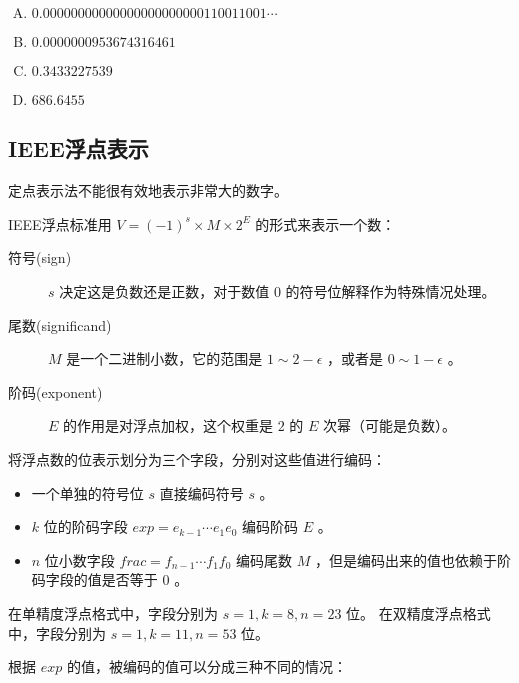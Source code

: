 {{        %
        \begin{practicec}
            \begin{enumerate}[A.]
                \item $0.0000 0000 0000 0000 0000 0001 1001 1001\cdots$
                \item $0.0000000953674316461$
                \item $0.3433227539$
                \item $686.6455$
            \end{enumerate}
        \end{practicec}
    }

    \subsection{IEEE浮点表示}
    {
        定点表示法不能很有效地表示非常大的数字。

        IEEE浮点标准用 $V = (-1)^s \times M \times 2^E$ 的形式来表示一个数：

        \begin{description}
            \item[符号(sign)] $s$ 决定这是负数还是正数，对于数值 $0$ 的符号位解释作为特殊情况处理。
            \item[尾数(significand)] $M$ 是一个二进制小数，它的范围是 $1 \sim 2 - \epsilon$ ，或者是 $0 \sim 1 - \epsilon$ 。
            \item[阶码(exponent)] $E$ 的作用是对浮点加权，这个权重是 $2$ 的 $E$ 次幂（可能是负数）。
        \end{description}

        将浮点数的位表示划分为三个字段，分别对这些值进行编码：

        \begin{itemize}
            \item 一个单独的符号位 $s$ 直接编码符号 $s$ 。
            \item $k$ 位的阶码字段 $exp = e_{k - 1}\cdots e_1e_0$ 编码阶码 $E$ 。
            \item $n$ 位小数字段 $frac = f_{n - 1}\cdots f_1f_0$ 编码尾数 $M$ ，但是编码出来的值也依赖于阶码字段的值是否等于 $0$ 。
        \end{itemize}

        在单精度浮点格式中，字段分别为 $s = 1, k = 8, n = 23$ 位。
        在双精度浮点格式中，字段分别为 $s = 1, k = 11, n = 53$ 位。

        根据 $exp$ 的值，被编码的值可以分成三种不同的情况：

}}
